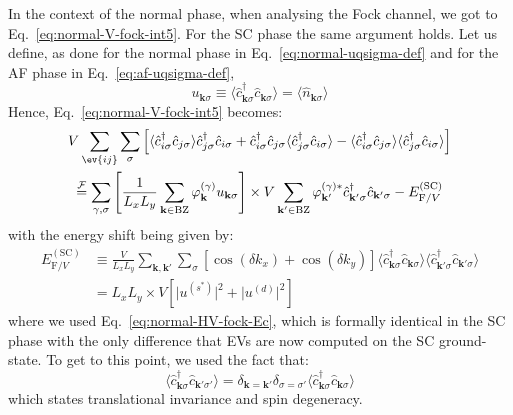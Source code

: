 In the context of the normal phase, when analysing the Fock channel, we got to Eq.~\eqref{eq:normal-V-fock-int5}. For the SC phase the same argument holds. Let us define, as done for the normal phase in Eq.~\eqref{eq:normal-uqsigma-def} and for the AF phase in Eq.~\eqref{eq:af-uqsigma-def},
\begin{equation}
	u_{\mathbf{k}\sigma} \equiv \langle
	\hat c_{\mathbf{k}\sigma}^\dagger
	\hat c_{\mathbf{k}\sigma}
	\rangle \label{eq:sc-uqsigma-def} = \langle
	\hat n_{\mathbf{k}\sigma} \rangle \nonumber
\end{equation}
Hence, Eq.~\eqref{eq:normal-V-fock-int5} becomes:
\begin{multline}
	V \sum_{\ev{ij}} \sum_\sigma \left[
		\langle
			\hat c_{i\sigma}^\dagger \hat c_{j\sigma}
		\rangle \hat c_{j\sigma}^\dagger  \hat c_{i\sigma} + 
		\hat c_{i\sigma}^\dagger \hat c_{j\sigma}
		\langle 
			\hat c_{j\sigma}^\dagger  \hat c_{i\sigma} 
		\rangle - \langle
			\hat c_{i\sigma}^\dagger \hat c_{j\sigma}
		\rangle \langle 
			\hat c_{j\sigma}^\dagger  \hat 	c_{i\sigma} 
		\rangle
	\right] \\
	\stackrel{\mathcal{F}}{=} \sum_{\gamma,\sigma} \left[
		\frac{1}{L_x L_y} \sum_{\mathbf{k}\in\mathrm{BZ}} \varphi_\mathbf{k}^{(\gamma)}
		u_{\mathbf{k}\sigma}
	\right] \times V
	\sum_{\mathbf{k}'\in\mathrm{BZ}}
	\varphi_{\mathbf{k}'}^{(\gamma)*}
	\hat c_{\mathbf{k}'\sigma}^\dagger
	\hat c_{\mathbf{k}'\sigma} - E_{\mathrm{F}/V}^{(\mathrm{SC})} \label{eq:sc-V-fock-int1}
\end{multline}
with the energy shift being given by:
\begin{align}
	E_{\mathrm{F}/V}^{(\mathrm{SC})} &\equiv \frac{V}{L_x L_y} \sum_{\mathbf{k}, \mathbf{k}'} \sum_\sigma \left[
	\cos \left(
	\delta k_x
	\right)	+ \cos \left(
	\delta k_y
	\right)	
	\right]	
	\langle
	\hat c_{\mathbf{k}\sigma}^\dagger 
	\hat c_{\mathbf{k}\sigma}
	\rangle \langle
	\hat c_{\mathbf{k}'\sigma}^\dagger  \hat c_{\mathbf{k}'\sigma} 
	\rangle \\
	&= L_x L_y \times V \left[
	\big|
	u^{(s^*)}
	\big|^2 + \big|
	u^{(d)}
	\big|^2
	\right] \label{eq:sc-fock-V-contraction-energy}
\end{align}
where we used Eq.~\eqref{eq:normal-HV-fock-Ec}, which is formally identical in the SC phase with the only difference that EVs are now computed on the SC ground-state. To get to this point, we used the fact that:
\[
	\langle \hat c_{\mathbf{k}\sigma}^\dagger \hat c_{\mathbf{k}' \sigma'} \rangle = \delta_{\mathbf{k}=\mathbf{k}'} \delta_{\sigma=\sigma'} \langle \hat c_{\mathbf{k} \sigma}^\dagger \hat c_{\mathbf{k} \sigma} \rangle
\]
which states translational invariance and spin degeneracy. 


